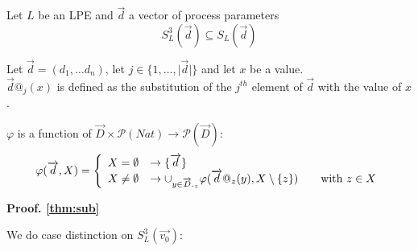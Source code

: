 \index{}\documentclass[a4paper,10pt]{article}
\theoremstyle{plain}
\theoremstyle{definition}
\newcommand{\ovr}{\overrightarrow}
\newcommand{\pps}{process parameters}
\newcommand{\tb}{\textbf}
\begin{document}
\begin{thm} Let $L$ be an LPE and $\ovr{d}$ a vector of \pps \label{thm:sub}
$$S_L^3(\ovr{d}) \subseteq S_L(\ovr{d}) $$
\end{thm} 
\begin{flushleft}

\begin{defn}[$@$] Let $\ovr{d} = (d_1, \dots d_n)$, let $j \in \lbrace 1, \ldots , \vert \ovr{d} \vert \rbrace$ and let $x$ be a value.\\
$\ovr{d}@_j(x)$ is defined as the substitution of the $j^{th}$ element of $\ovr{d}$ with the value of $x$.
\end{defn}


\begin{defn}[$\varphi(\ovr{d},X)$] 
$\varphi$ is a function of $\ovr{D} \times \mathcal{P}(Nat) \rightarrow \mathcal{P}(\ovr{D})$:
\begin{displaymath}
    \varphi(\ovr{d},X) = \left \{
        \begin{array}{l l}
            X = \emptyset                       & \rightarrow \lbrace \ovr{d} \rbrace \\
            X \neq \emptyset                    & \rightarrow \cup_{y \in \ovr{D}._z} \varphi(\ovr{d}@_z(y), X \setminus \lbrace z \rbrace ) \hspace{20pt} \text{with } z \in X \\
        \end{array} \right.
\end{displaymath}

\end{defn}

\tb{Proof. \ref{thm:sub}}
\end{flushleft}
We do case distinction on $S_L^3(\ovr{v_0})$:\\
\end{document}
